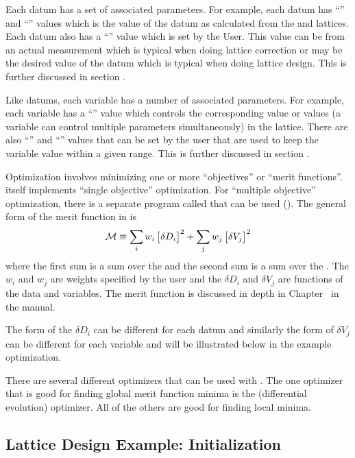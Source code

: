 \documentclass{hitec}     %
\begin{document}
Each datum has a set of associated parameters. For example, each datum has ``'' and
``'' values which is the value of the datum as calculated from the  and
 lattices. Each datum also has a ``'' value which is set by the User. This
value can be from an actual measurement which is typical when doing lattice correction or may be the
desired value of the datum which is typical when doing lattice design. This is further discussed in
section . 

Like datums, each variable has a number of associated parameters. For example, each variable has a
``'' value which controls the corresponding value or values (a variable can control
multiple parameters simultaneously) in the  lattice. There are also ``'' and
``'' values that can be set by the user that are used to keep the variable 
value within a given range. This is further discussed in section .

Optimization involves minimizing one or more ``objectives'' or ``merit functions''. \tao itself
implements ``single objective'' optimization. For ``multiple objective'' optimization, there is a
separate program called  that can be used (). The general form of the
merit function  in \tao is
\begin{equation}
  {\cal M} \equiv 
    \sum_{i} w_i \, \bigl[ \delta D_i \bigr]^2 + 
    \sum_{j} w_j \, \bigl[ \delta V_j \bigr]^2
  \label{m1}
\end{equation}
where the first sum is a sum over the  and the second sum is a sum over the
. The $w_i$ and $w_j$ are weights specified by the user and the $\delta D_i$ and
$\delta V_j$ are functions of the data and variables. The merit function is discussed in depth in
Chapter~ in the \tao manual.

The form of the $\delta D_i$ can be different for each datum and similarly the form of $\delta V_j$
can be different for each variable and will be illustrated below in the example optimization.

There are several different optimizers that can be used with \tao. The one optimizer that is good
for finding global merit function minima is the  (differential evolution) optimizer. All of
the others are good for finding local minima.

\subsection{Lattice Design Example: Initialization}
\label{s:opt.files}
\end{document}
